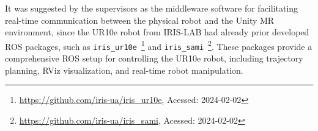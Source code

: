 It was suggested by the supervisors as the middleware software for facilitating real-time communication between the physical robot and the Unity \ac{MR} environment, since the UR10e robot from IRIS-LAB had already prior developed \ac{ROS} packages, such as \texttt{iris\_ur10e}~\footnote{\url{https://github.com/iris-ua/iris_ur10e}, Acessed: 2024-02-02} and \texttt{iris\_sami}~\footnote{\url{https://github.com/iris-ua/iris_sami}, Acessed: 2024-02-02}. These packages provide a comprehensive \ac{ROS} setup for controlling the UR10e robot, including trajectory planning, RViz visualization, and real-time robot manipulation. 




